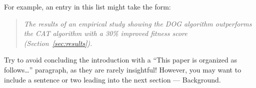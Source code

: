 For example, an entry in this list might take the form:
\begin{quote} \it The results of an empirical study showing the DOG algorithm
outperforms the CAT algorithm with a 30\% improved fitness score
(Section~\ref{sec:results}).
\end{quote}

Try to avoid concluding the introduction with a ``This paper is organized as
follows\ldots'' paragraph, as they are rarely insightful!
%
However, you may want to include a sentence or two leading into the next section
--- Background.
